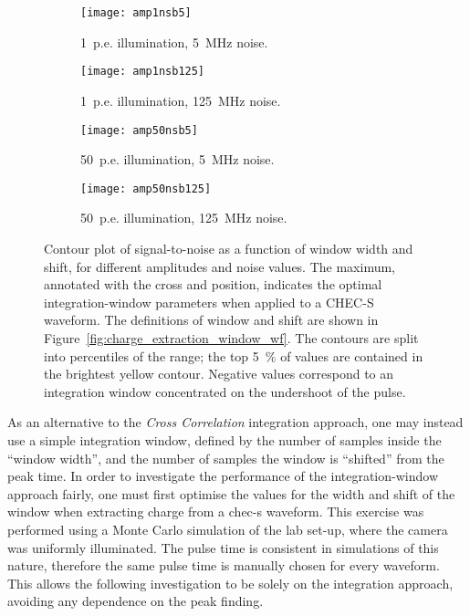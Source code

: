 \begin{figure}
  \begin{subfigure}[b]{0.49\textwidth}
    \texttt{[image: amp1nsb5]}
    \caption{1~p.e. illumination, 5~MHz noise.}
    \label{fig:amp1nsb5}
  \end{subfigure}
  \hfill
  \begin{subfigure}[b]{0.49\textwidth}
    \texttt{[image: amp1nsb125]}
    \caption{1~p.e. illumination, 125~MHz noise.}
    \label{fig:amp1nsb125}
  \end{subfigure}
  \hfill
  \begin{subfigure}[b]{0.49\textwidth}
    \texttt{[image: amp50nsb5]}
    \caption{50~p.e. illumination, 5~MHz noise.}
    \label{fig:amp50nsb5}
  \end{subfigure}
  \hfill
  \begin{subfigure}[b]{0.49\textwidth}
    \texttt{[image: amp50nsb125]}
    \caption{50~p.e. illumination, 125~MHz noise.}
    \label{fig:amp50nsb125}
  \end{subfigure}
  \caption[Optimal integration-window parameters.]{Contour plot of signal-to-noise as a function of window width and shift, for different amplitudes and noise values. The maximum, annotated with the cross and position, indicates the optimal integration-window parameters when applied to a CHEC-S waveform. The definitions of window and shift are shown in Figure~\ref{fig:charge_extraction_window_wf}. The contours are split into percentiles of the range; the top \SI{5}{\percent} of values are contained in the brightest yellow contour. Negative values correspond to an integration window concentrated on the undershoot of the pulse.}
  \label{fig:snr_noc}
\end{figure}

As an alternative to the \textit{Cross Correlation} integration approach, one may instead use a simple integration window, defined by the number of samples inside the ``window width'', and the number of samples the window is ``shifted'' from the peak time. In order to investigate the performance of the integration-window approach fairly, one must first optimise the values for the width and shift of the window when extracting charge from a \gls{chec-s} waveform. This exercise was performed using a Monte Carlo simulation of the lab set-up, where the camera was uniformly illuminated. The pulse time is consistent in simulations of this nature, therefore the same pulse time is manually chosen for every waveform. This allows the following investigation to be solely on the integration approach, avoiding any dependence on the peak finding.

